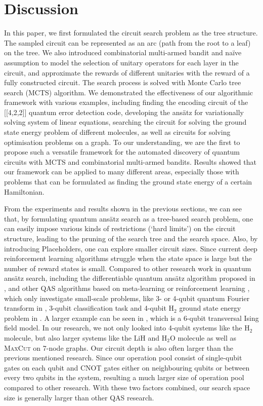 \documentclass{ieeeaccess}
\begin{document}
\section{Discussion}\label{discussion}
In this paper, we first formulated the circuit search problem as the tree structure. The sampled circuit can be represented as an arc (path from the root to a leaf) on the tree. We also introduced combinatorial multi-armed bandit and na\"ive assumption to model the selection of unitary operators for each layer in the circuit, and approximate the rewards of different unitaries with the reward of a fully constructed circuit. The search process is solved with Monte Carlo tree search (MCTS) algorithm. We demonstrated the effectiveness of our algorithmic framework with various examples, including finding the encoding circuit of the [[4,2,2]] quantum error detection code, developing the ans\"atz for variationally solving system of linear equations, searching the circuit for solving the ground state energy problem of different molecules, as well as circuits for solving optimisation problems on a graph. To our understanding, we are the first to propose such a versatile framework for the automated discovery of quantum circuits with MCTS and combinatorial multi-armed bandits. Results showed that our framework can be applied to many different areas, especially those with problems that can be formulated as finding the ground state energy of a certain Hamiltonian.

From the experiments and results shown in the previous sections, we can see that, by formulating quantum ans\"atz search as a tree-based search problem, one can easily impose various kinds of restrictions (`hard limits') on the circuit structure, leading to the pruning of the search tree and the search space. Also, by introducing Placeholders, one can explore smaller circuit sizes. Since current deep reinforcement learning algorithms struggle when the state space is large but the number of reward states is small. Compared to other research work in quantum ans\"atz search, including the differentiable quantum ans\"atz algorithm proposed in \cite{zhang2021differentiable}, and other QAS algorithms based on meta-learning \cite{chen2021quantum} or reinforcement learning \cite{kuo2021quantum}, which only investigate small-scale problems, like 3- or 4-qubit quantum Fourier transform in \cite{zhang2021differentiable}, 3-qubit classification task and 4-qubit $\text{H}_2$ ground state energy problem in \cite{du2020quantum}. A larger example can be seen in \cite{zhang2021neural}, which is a 6-qubit transversal Ising field model. In our research, we not only looked into 4-qubit systems like the $\text{H}_2$ molecule, but also larger systems like the $\text{LiH}$ and $\text{H}_2\text{O}$ molecule as well as \textsc{MaxCut} on 7-node graphs. Our circuit depth is also often larger than the previous mentioned research. Since our operation pool consist of single-qubit gates on each qubit and CNOT gates either on neighbouring qubits or between every two qubits in the system, resulting a much larger size of operation pool compared to other research. With these two factors combined, our search space size is generally larger than other QAS research.
\end{document}
